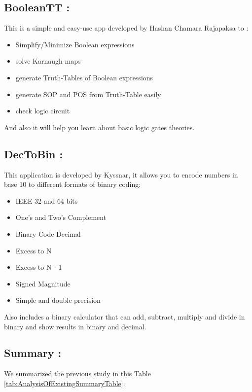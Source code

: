  
 
 \subsection{BooleanTT :}
 This is a simple and easy-use app developed by Hashan Chamara Rajapaksa to :
 \begin{itemize}
	 \item Simplify/Minimize Boolean expressions
	 \item solve Karnaugh maps
	 \item generate Truth-Tables of Boolean expressions
	 \item generate SOP and POS from Truth-Table easily
	 \item check logic circuit
 \end{itemize}
 And also it will help you learn about basic logic gates theories.\cite{BooleanTT}
 
 \subsection{DecToBin :}
 This application is developed by Kyssnar, it allows you to encode numbers in base 10 to different formats of binary coding:
 \begin{itemize}
	\item IEEE 32 and 64 bits
	\item One's and Two's Complement
	\item Binary Code Decimal
	\item Excess to N
	\item Excess to N - 1
	\item Signed Magnitude
	\item Simple and double precision
\end{itemize}
 Also includes a binary calculator that can add, subtract, multiply and divide in binary and show results in binary and decimal.\cite{dectobin}
 
 \subsection{Summary :}
We summarized the previous study in this Table \ref{tab:AnalysisOfExistingSummaryTable}.

